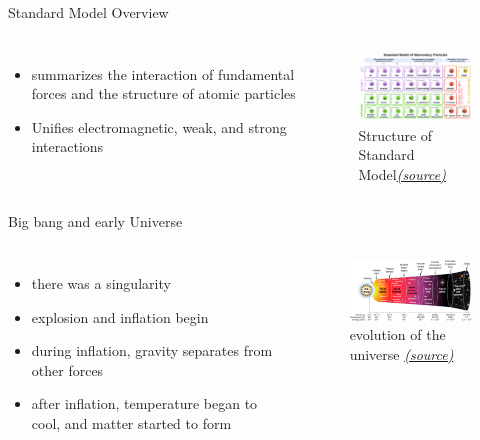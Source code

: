 \documentclass[12pt,aspectratio169]{beamer}
\begin{document}
\begin{frame}{Standard Model Overview}
\begin{columns}
    \begin{itemize}
        \item \footnotesize summarizes the interaction of fundamental forces and the structure of atomic particles
        \item Unifies electromagnetic, weak, and strong interactions


    \end{itemize}
    \begin{figure}
    \centering
    \includegraphics[width=6cm]{standard model.png}
    \caption{Structure of Standard Model\href{https://quantum.lassp.cornell.edu/lecture/elementary_particle_physics}{\textit{(source)}}}
    \end{figure}
\end{columns}
\end{frame}
\begin{frame}{Big bang and early Universe}
\begin{columns}
    \begin{itemize}
        \item \footnotesize there was a singularity
        \item explosion and inflation begin
        \item during inflation, gravity separates from other forces
        \item after inflation, temperature began to cool, and matter started to form


    \end{itemize}
    \begin{figure}
    \centering
    \includegraphics[width=5cm]{bigbang.jpg}
    \caption{evolution of the universe \href{https://phys.libretexts}{\textit{(source)}}}
    \end{figure}
\end{columns}
\end{frame}
\end{document}
